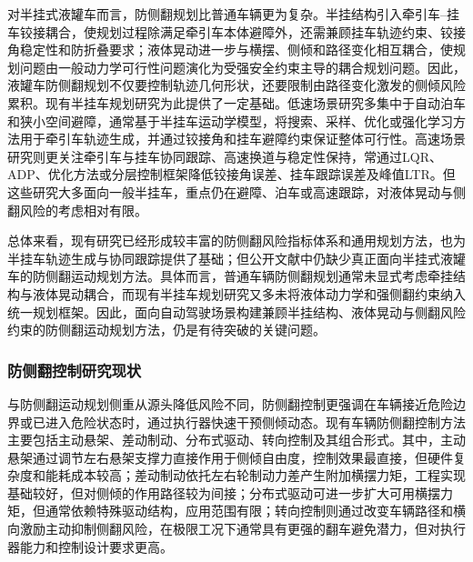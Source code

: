       对半挂式液罐车而言，防侧翻规划比普通车辆更为复杂。半挂结构引入牵引车--挂车铰接耦合，使规划过程除满足牵引车本体避障外，还需兼顾挂车轨迹约束、铰接角稳定性和防折叠要求\cite{zongchangfu2014identification,niezhigen2015heavyduty}；液体晃动进一步与横摆、侧倾和路径变化相互耦合，使规划问题由一般动力学可行性问题演化为受强安全约束主导的耦合规划问题。因此，液罐车防侧翻规划不仅要控制轨迹几何形状，还要限制由路径变化激发的侧倾风险累积。现有半挂车规划研究为此提供了一定基础。低速场景研究多集中于自动泊车和狭小空间避障，通常基于半挂车运动学模型，将搜索、采样、优化或强化学习方法用于牵引车轨迹生成，并通过铰接角和挂车避障约束保证整体可行性\cite{wangyuanmin2024,chenchao2023,jiasenchao2023}。高速场景研究则更关注牵引车与挂车协同跟踪、高速换道与稳定性保持，常通过LQR、ADP、优化方法或分层控制框架降低铰接角误差、挂车跟踪误差及峰值LTR\cite{lisixu2021,caoliling2024,zhangfawang2025,songguanghao2023,wanghongchang2023}。但这些研究大多面向一般半挂车，重点仍在避障、泊车或高速跟踪，对液体晃动与侧翻风险的考虑相对有限。

      总体来看，现有研究已经形成较丰富的防侧翻风险指标体系和通用规划方法，也为半挂车轨迹生成与协同跟踪提供了基础；但公开文献中仍缺少真正面向半挂式液罐车的防侧翻运动规划方法。具体而言，普通车辆防侧翻规划通常未显式考虑牵挂结构与液体晃动耦合，而现有半挂车规划研究又多未将液体动力学和强侧翻约束纳入统一规划框架。因此，面向自动驾驶场景构建兼顾半挂结构、液体晃动与侧翻风险约束的防侧翻运动规划方法，仍是有待突破的关键问题。

    \subsubsection{防侧翻控制研究现状}

      与防侧翻运动规划侧重从源头降低风险不同，防侧翻控制更强调在车辆接近危险边界或已进入危险状态时，通过执行器快速干预侧倾动态。现有车辆防侧翻控制方法主要包括主动悬架、差动制动、分布式驱动、转向控制及其组合形式\cite{xu2011rollover,liang2022multiagent}。其中，主动悬架通过调节左右悬架支撑力直接作用于侧倾自由度，控制效果最直接，但硬件复杂度和能耗成本较高\cite{xiao2020rollsuspension}；差动制动依托左右轮制动力差产生附加横摆力矩，工程实现基础较好，但对侧倾的作用路径较为间接\cite{carlson1981two}；分布式驱动可进一步扩大可用横摆力矩，但通常依赖特殊驱动结构，应用范围有限\cite{zilin2023integrated}；转向控制则通过改变车辆路径和横向激励主动抑制侧翻风险，在极限工况下通常具有更强的翻车避免潜力，但对执行器能力和控制设计要求更高\cite{shao2023vhrobustmpc}。

